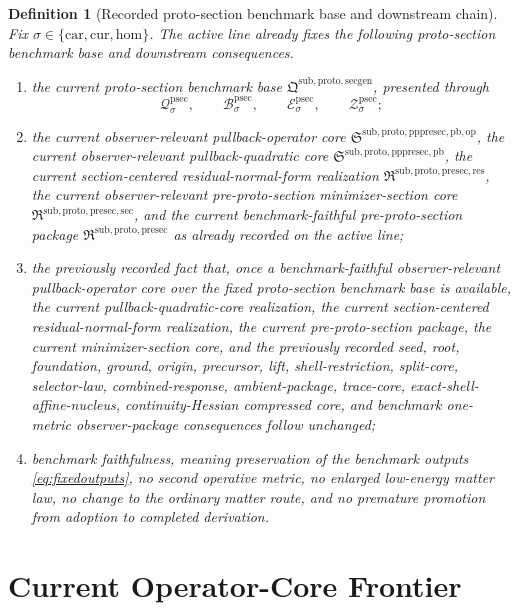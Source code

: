 \documentclass[11pt]{article}
\newcommand{\Car}{\mathrm{car}}
\newcommand{\Cur}{\mathrm{cur}}
\newcommand{\Hom}{\mathrm{hom}}
\newcommand{\ProtoSectionPackage}{\mathfrak Q^{\mathrm{sub,proto,secgen}}}
\newcommand{\ProtoSectionState}[1]{\mathcal Q_{#1}^{\mathrm{psec}}}
\newcommand{\ProtoSectionBody}[1]{\mathcal B_{#1}^{\mathrm{psec}}}
\newcommand{\ProtoSectionFunctional}[1]{\mathscr E_{#1}^{\mathrm{psec}}}
\newcommand{\ProtoSectionShell}[1]{\mathcal Z_{#1}^{\mathrm{psec}}}
\newcommand{\PreProtoSectionPackage}{\mathfrak R^{\mathrm{sub,proto,presec}}}
\newcommand{\PreProtoSectionMinSectionCore}{\mathfrak R^{\mathrm{sub,proto,presec,sec}}}
\newcommand{\PreProtoSectionResidualPackage}{\mathfrak R^{\mathrm{sub,proto,presec,res}}}
\newcommand{\PrePreProtoSectionPullbackCore}{\mathfrak S^{\mathrm{sub,proto,pppresec,pb}}}
\newcommand{\PullbackOperatorCore}{\mathfrak S^{\mathrm{sub,proto,pppresec,pb,op}}}
\newtheorem{definition}{Definition}
\begin{document}
\begin{definition}[Recorded proto-section benchmark base and downstream chain]
\label{def:downstream}
Fix \(\sigma\in\{\Car,\Cur,\Hom\}\). The active line already fixes the following proto-section benchmark base and downstream consequences.
\begin{enumerate}
    \item the current proto-section benchmark base \(\ProtoSectionPackage\), presented through
    \[
    \ProtoSectionState{\sigma},\qquad
    \ProtoSectionBody{\sigma},\qquad
    \ProtoSectionFunctional{\sigma},\qquad
    \ProtoSectionShell{\sigma};
    \]
    \item the current observer-relevant pullback-operator core \(\PullbackOperatorCore\), the current observer-relevant pullback-quadratic core \(\PrePreProtoSectionPullbackCore\), the current section-centered residual-normal-form realization \(\PreProtoSectionResidualPackage\), the current observer-relevant pre-proto-section minimizer-section core \(\PreProtoSectionMinSectionCore\), and the current benchmark-faithful pre-proto-section package \(\PreProtoSectionPackage\) as already recorded on the active line;
    \item the previously recorded fact that, once a benchmark-faithful observer-relevant pullback-operator core over the fixed proto-section benchmark base is available, the current pullback-quadratic-core realization, the current section-centered residual-normal-form realization, the current pre-proto-section package, the current minimizer-section core, and the previously recorded seed, root, foundation, ground, origin, precursor, lift, shell-restriction, split-core, selector-law, combined-response, ambient-package, trace-core, exact-shell-affine-nucleus, continuity-Hessian compressed core, and benchmark one-metric observer-package consequences follow unchanged;
    \item benchmark faithfulness, meaning preservation of the benchmark outputs \eqref{eq:fixedoutputs}, no second operative metric, no enlarged low-energy matter law, no change to the ordinary matter route, and no premature promotion from adoption to completed derivation.
\end{enumerate}
\end{definition}

\section{Current Operator-Core Frontier}
\end{document}
